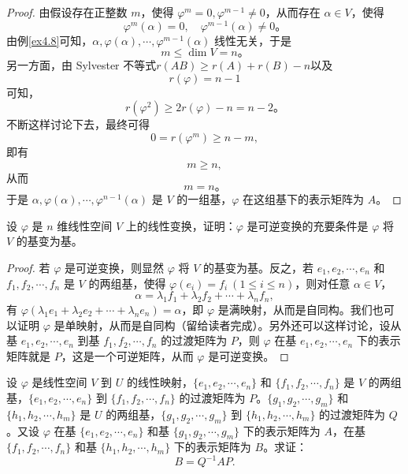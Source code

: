 \documentclass[lang=cn,12pt]{elegantbook}
\begin{document}
\begin{proof}
    由假设存在正整数 \( m \)，使得 \( \varphi^m = 0, \varphi^{m-1} \neq 0 \)，从而存在 \( \alpha \in V \)，使得  
    \[
    \varphi^m(\alpha) = 0, \quad \varphi^{m-1}(\alpha) \neq 0。
    \]  
    由例\ref{ex4.8}可知，\( \alpha, \varphi(\alpha), \cdots, \varphi^{m-1}(\alpha) \) 线性无关，于是  
    \[
    m \leq \dim V = n。
    \]  
    另一方面，由 Sylvester 不等式$r(AB) \geq r(A) + r(B) -n $以及  
    \[
    r(\varphi) = n - 1
    \]  
    可知，
    \[
    r(\varphi^2) \geq 2r(\varphi) - n = n - 2。
    \]  
    不断这样讨论下去，最终可得  
    \[
    0 = r(\varphi^m) \geq n - m,
    \]  
    即有  
    \[
    m \geq n,
    \]  
    从而  
    \[
    m = n。
    \]  
    于是 \( \alpha, \varphi(\alpha), \cdots, \varphi^{n-1}(\alpha) \) 是 \( V \) 的一组基，\( \varphi \) 在这组基下的表示矩阵为 \( A \)。
\end{proof}

\begin{example}
    设 \(\varphi\) 是 \(n\) 维线性空间 \(V\) 上的线性变换，证明：\(\varphi\) 是可逆变换的充要条件是 \(\varphi\) 将 \(V\) 的基变为基。
\end{example}
    
\begin{proof}
若 \(\varphi\) 是可逆变换，则显然 \(\varphi\) 将 \(V\) 的基变为基。反之，若 \(e_1, e_2, \cdots, e_n\) 和 \(f_1, f_2, \cdots, f_n\) 是 \(V\) 的两组基，使得 \(\varphi(e_i) = f_i \ (1 \leq i \leq n)\)，则对任意 \(\alpha \in V\)，
\[
\alpha = \lambda_1 f_1 + \lambda_2 f_2 + \cdots + \lambda_n f_n,
\]
有 \(\varphi(\lambda_1 e_1 + \lambda_2 e_2 + \cdots + \lambda_n e_n) = \alpha\)，即 \(\varphi\) 是满映射，从而是自同构。我们也可以证明 \(\varphi\) 是单映射，从而是自同构（留给读者完成）。另外还可以这样讨论，设从基 \(e_1, e_2, \cdots, e_n\) 到基 \(f_1, f_2, \cdots, f_n\) 的过渡矩阵为 \(P\)，则 \(\varphi\) 在基 \(e_1, e_2, \cdots, e_n\) 下的表示矩阵就是 \(P\)，这是一个可逆矩阵，从而 \(\varphi\) 是可逆变换。
\end{proof}

\begin{example}\label{ex4.21}
    设 \(\varphi\) 是线性空间 \(V\) 到 \(U\) 的线性映射，\(\{e_1, e_2, \cdots, e_n\}\) 和 \(\{f_1, f_2, \cdots, f_n\}\) 是 \(V\) 的两组基，\(\{e_1, e_2, \cdots, e_n\}\) 到 \(\{f_1, f_2, \cdots, f_n\}\) 的过渡矩阵为 \(P\)。\(\{g_1, g_2, \cdots, g_m\}\) 和 \(\{h_1, h_2, \cdots, h_m\}\) 是 \(U\) 的两组基，\(\{g_1, g_2, \cdots, g_m\}\) 到 \(\{h_1, h_2, \cdots, h_m\}\) 的过渡矩阵为 \(Q\)。又设 \(\varphi\) 在基 \(\{e_1, e_2, \cdots, e_n\}\) 和基 \(\{g_1, g_2, \cdots, g_m\}\) 下的表示矩阵为 \(A\)，在基 \(\{f_1, f_2, \cdots, f_n\}\) 和基 \(\{h_1, h_2, \cdots, h_m\}\) 下的表示矩阵为 \(B\)。求证：
    \[
    B = Q^{-1}AP.
    \]
\end{example}
    
\end{document}
